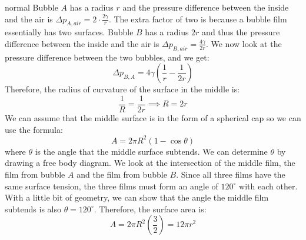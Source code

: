 \begin{solution}{normal}
Bubble $A$ has a radius $r$ and the pressure difference between the inside and the air is $\Delta p_{A,air}=2\cdot\frac{2\gamma}{r}$. The extra factor of two is because a bubble film essentially has two surfaces. Bubble $B$ has a radius $2r$ and thus the pressure difference between the inside and the air is  $\Delta p_{B,air}=\frac{4\gamma}{2r}$. We now look at the pressure difference between the two bubbles, and we get:
$$\Delta p_{B,A} = 4\gamma\left(\frac{1}{r}-\frac{1}{2r}\right)$$
Therefore, the radius of curvature of the surface in the middle is:
$$\frac{1}{R} = \frac{1}{2r} \implies R = 2r$$
We can assume that the middle surface is in the form of a spherical cap so we can use the formula:
$$A=2\pi R^2(1-\cos\theta)$$
where $\theta$ is the angle that the middle surface subtends. We can determine $\theta$ by drawing a free body diagram. We look at the intersection of the middle film, the film from bubble $A$ and the film from bubble $B$. Since all three films have the same surface tension, the three films must form an angle of $120^\circ$ with each other. With a little bit of geometry, we can show that the angle the middle film subtends is also $\theta=120^\circ$. Therefore, the surface area is:
$$A=2\pi R^2\left(\frac{3}{2}\right) = \boxed{12\pi r^2}$$
\end{solution}